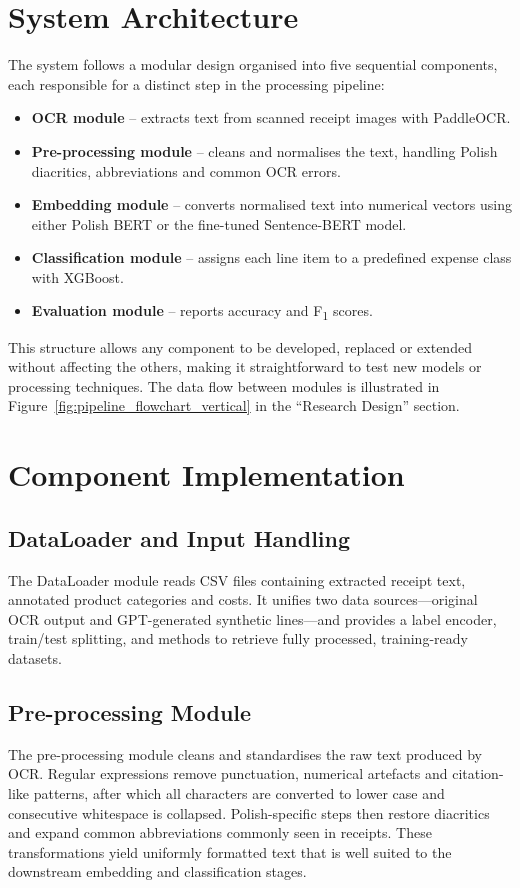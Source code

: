 \documentclass{SGGW-thesis-EN}
\begin{document}
\section{System Architecture}
The system follows a modular design organised into five sequential components, each responsible for a distinct step in
the processing pipeline:

\begin{itemize}
  \item \textbf{OCR module} – extracts text from scanned receipt images with PaddleOCR.
  \item \textbf{Pre-processing module} – cleans and normalises the text, handling Polish diacritics, abbreviations and
        common OCR errors.
  \item \textbf{Embedding module} – converts normalised text into numerical vectors using either Polish BERT or the
        fine-tuned Sentence-BERT model.
  \item \textbf{Classification module} – assigns each line item to a predefined expense class with XGBoost.
  \item \textbf{Evaluation module} – reports accuracy and F\textsubscript{1} scores.
\end{itemize}

This structure allows any component to be developed, replaced or extended without affecting the others, making it
straightforward to test new models or processing techniques. The data flow between modules is illustrated in
Figure~\ref{fig:pipeline_flowchart_vertical} in the “Research Design” section.

\section{Component Implementation}

\subsection{DataLoader and Input Handling}
The DataLoader module reads CSV files containing extracted receipt text, annotated product categories and costs. 
It unifies two data sources—original OCR output and GPT-generated synthetic lines—and provides a label encoder, train/test splitting,
and methods to retrieve fully processed, training-ready datasets.

\subsection{Pre-processing Module}
The pre-processing module cleans and standardises the raw text produced by OCR. Regular expressions remove punctuation,
numerical artefacts and citation-like patterns, after which all characters are converted to lower case and consecutive
whitespace is collapsed. Polish-specific steps then restore diacritics and expand common abbreviations commonly seen in
receipts. These transformations yield uniformly formatted text that is well suited to the downstream embedding and
classification stages.
\end{document}
